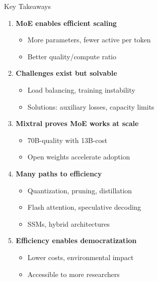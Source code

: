 \documentclass[aspectratio=169]{beamer}
\begin{document}
\begin{frame}[shrink=10]{Key Takeaways 🔑}
\begin{enumerate}\setlength{\itemsep}{0pt}
    \item \textbf{MoE enables efficient scaling}
    \begin{itemize}\setlength{\itemsep}{0pt}
        \item More parameters, fewer active per token
        \item Better quality/compute ratio
    \end{itemize}

    \vspace{0.2em}

    \item \textbf{Challenges exist but solvable}
    \begin{itemize}\setlength{\itemsep}{0pt}
        \item Load balancing, training instability
        \item Solutions: auxiliary losses, capacity limits
    \end{itemize}

    \vspace{0.2em}

    \item \textbf{Mixtral proves MoE works at scale}
    \begin{itemize}\setlength{\itemsep}{0pt}
        \item 70B-quality with 13B-cost
        \item Open weights accelerate adoption
    \end{itemize}

    \vspace{0.2em}

    \item \textbf{Many paths to efficiency}
    \begin{itemize}\setlength{\itemsep}{0pt}
        \item Quantization, pruning, distillation
        \item Flash attention, speculative decoding
        \item SSMs, hybrid architectures
    \end{itemize}

    \vspace{0.2em}

    \item \textbf{Efficiency enables democratization}
    \begin{itemize}\setlength{\itemsep}{0pt}
        \item Lower costs, environmental impact
        \item Accessible to more researchers
    \end{itemize}
\end{enumerate}
\end{frame}
\end{document}
